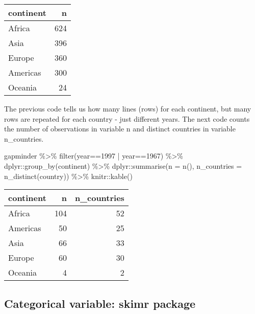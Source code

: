 \documentclass[
]{book}
\newenvironment{Shaded}{\begin{snugshade}}{\end{snugshade}}
\newcommand{\AttributeTok}[1]{\textcolor[rgb]{0.77,0.63,0.00}{#1}}
\newcommand{\DecValTok}[1]{\textcolor[rgb]{0.00,0.00,0.81}{#1}}
\newcommand{\FunctionTok}[1]{\textcolor[rgb]{0.00,0.00,0.00}{#1}}
\newcommand{\NormalTok}[1]{#1}
\newcommand{\SpecialCharTok}[1]{\textcolor[rgb]{0.00,0.00,0.00}{#1}}
\begin{document}
\begin{tabular}{l|r}
\hline
continent & n\\
\hline
Africa & 624\\
\hline
Asia & 396\\
\hline
Europe & 360\\
\hline
Americas & 300\\
\hline
Oceania & 24\\
\hline
\end{tabular}

The previous code tells us how many lines (rows) for each continent, but many rows are repeated for each country - just different years. The next code counts the number of observations in variable n and distinct countries in variable n\_countries.

\begin{Shaded}
\begin{Highlighting}[]
\NormalTok{gapminder }\SpecialCharTok{\%\textgreater{}\%} \FunctionTok{filter}\NormalTok{(year}\SpecialCharTok{==}\DecValTok{1997} \SpecialCharTok{|}\NormalTok{ year}\SpecialCharTok{==}\DecValTok{1967}\NormalTok{) }\SpecialCharTok{\%\textgreater{}\%}
\NormalTok{  dplyr}\SpecialCharTok{::}\FunctionTok{group\_by}\NormalTok{(continent) }\SpecialCharTok{\%\textgreater{}\%}
\NormalTok{  dplyr}\SpecialCharTok{::}\FunctionTok{summarise}\NormalTok{(}\AttributeTok{n =} \FunctionTok{n}\NormalTok{(), }\AttributeTok{n\_countries =} \FunctionTok{n\_distinct}\NormalTok{(country)) }\SpecialCharTok{\%\textgreater{}\%}\NormalTok{ knitr}\SpecialCharTok{::}\FunctionTok{kable}\NormalTok{()}
\end{Highlighting}
\end{Shaded}

\begin{tabular}{l|r|r}
\hline
continent & n & n\_countries\\
\hline
Africa & 104 & 52\\
\hline
Americas & 50 & 25\\
\hline
Asia & 66 & 33\\
\hline
Europe & 60 & 30\\
\hline
Oceania & 4 & 2\\
\hline
\end{tabular}

\hypertarget{categorical-variable-skimr-package}{%
\subsection{Categorical variable: skimr package}\label{categorical-variable-skimr-package}}
\end{document}
